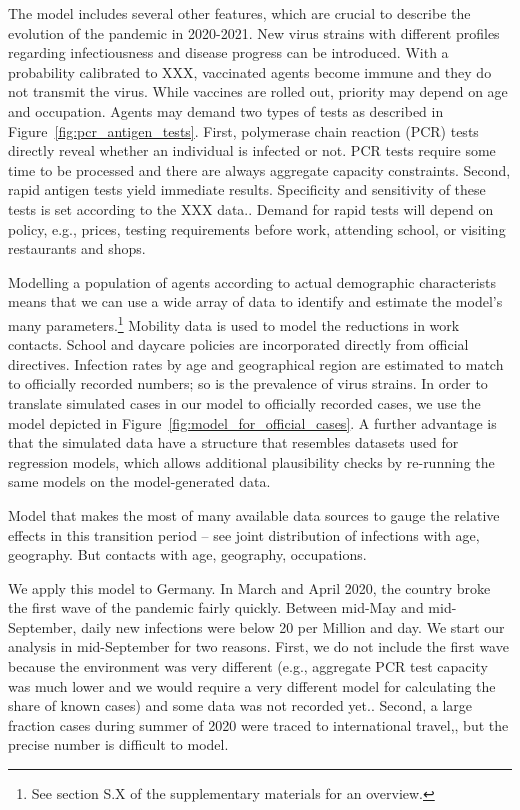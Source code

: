 The model includes several other features, which are crucial to describe the evolution of the pandemic in 2020-2021. New virus strains with different profiles regarding infectiousness and disease progress can be introduced. With a probability calibrated to XXX, vaccinated agents become immune and they do not transmit the virus. While vaccines are rolled out, priority may depend on age and occupation. Agents may demand two types of tests as described in Figure~\ref{fig:pcr_antigen_tests}. First, polymerase chain reaction (PCR) tests directly reveal whether an individual is infected or not. PCR tests require some time to be processed and there are always aggregate capacity constraints. Second, rapid antigen tests yield immediate results. Specificity and sensitivity of these tests is set according to the XXX data.. Demand for rapid tests will depend on policy, e.g., prices, testing requirements before work, attending school, or visiting restaurants and shops.

Modelling a population of agents according to actual demographic characterists means that we can use a wide array of data to identify and estimate the model's many parameters.\footnote{See section S.X of the supplementary materials for an overview.} Mobility data is used to model the reductions in work contacts. School and daycare policies are incorporated directly from official directives. Infection rates by age and geographical region are estimated to match to officially recorded numbers; so is the prevalence of virus strains. In order to translate simulated cases in our model to officially recorded cases, we use the model depicted in Figure~\ref{fig:model_for_official_cases}.  A further advantage is that the simulated data have a structure that resembles datasets used for regression models, which allows additional plausibility checks by re-running the same models on the model-generated data.

Model that makes the most of many available data sources to gauge the relative effects in this transition period -- see joint distribution of infections with age, geography. But contacts with age, geography, occupations.

We apply this model to Germany. In March and April 2020, the country broke the first wave of the pandemic fairly quickly. Between mid-May and mid-September, daily new infections were below 20 per Million and day. We start our analysis in mid-September for two reasons. First, we do not include the first wave because the environment was very different (e.g., aggregate PCR test capacity was much lower and we would require a very different model for calculating the share of known cases) and some data was not recorded yet.. Second, a large fraction cases during summer of 2020 were traced to international travel,, but the precise number is difficult to model. 

